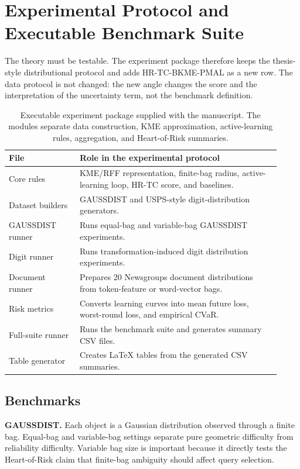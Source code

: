 \documentclass[10pt,journal]{IEEEtran}
\begin{document}
\section{Experimental Protocol and Executable Benchmark Suite}
\label{sec:experiments}

The theory must be testable. The experiment package therefore keeps the thesis-style distributional protocol and adds HR-TC-BKME-PMAL as a new row. The data protocol is not changed: the new angle changes the score and the interpretation of the uncertainty term, not the benchmark definition.

\begin{table}[t]
\centering
\caption{Executable experiment package supplied with the manuscript. The modules separate data construction, KME approximation, active-learning rules, aggregation, and Heart-of-Risk summaries.}
\label{tab:code-package-v5}
\small
\begin{tabular}{p{0.24\linewidth}p{0.68\linewidth}}
\toprule
File & Role in the experimental protocol \\
\midrule
Core rules & KME/RFF representation, finite-bag radius, active-learning loop, HR-TC score, and baselines. \\
Dataset builders & GAUSSDIST and USPS-style digit-distribution generators. \\
GAUSSDIST runner & Runs equal-bag and variable-bag GAUSSDIST experiments. \\
Digit runner & Runs transformation-induced digit distribution experiments. \\
Document runner & Prepares 20 Newsgroups document distributions from token-feature or word-vector bags. \\
Risk metrics & Converts learning curves into mean future loss, worst-round loss, and empirical CVaR. \\
Full-suite runner & Runs the benchmark suite and generates summary CSV files. \\
Table generator & Creates LaTeX tables from the generated CSV summaries. \\
\bottomrule
\end{tabular}
\end{table}

\subsection{Benchmarks}

\textbf{GAUSSDIST.} Each object is a Gaussian distribution observed through a finite bag. Equal-bag and variable-bag settings separate pure geometric difficulty from reliability difficulty. Variable bag size is important because it directly tests the Heart-of-Risk claim that finite-bag ambiguity should affect query selection.
\end{document}
